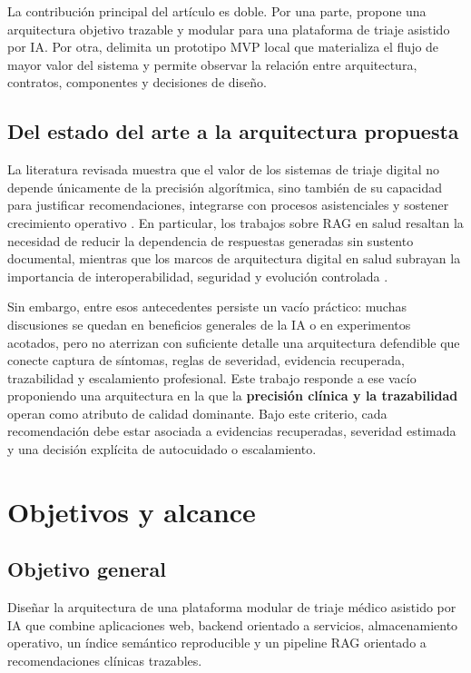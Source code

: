 \documentclass[12pt]{article}
\begin{document}
La contribución principal del artículo es doble. Por una parte, propone una arquitectura objetivo trazable y modular para una plataforma de triaje asistido por IA. Por otra, delimita un prototipo MVP local que materializa el flujo de mayor valor del sistema y permite observar la relación entre arquitectura, contratos, componentes y decisiones de diseño.

\subsection{Del estado del arte a la arquitectura propuesta}

La literatura revisada muestra que el valor de los sistemas de triaje digital no depende únicamente de la precisión algorítmica, sino también de su capacidad para justificar recomendaciones, integrarse con procesos asistenciales y sostener crecimiento operativo \cite{martinez2017, shen2023, rodriguez2026}. En particular, los trabajos sobre RAG en salud resaltan la necesidad de reducir la dependencia de respuestas generadas sin sustento documental, mientras que los marcos de arquitectura digital en salud subrayan la importancia de interoperabilidad, seguridad y evolución controlada \cite{neha2024, who2025dhea, minciencias2021}.

Sin embargo, entre esos antecedentes persiste un vacío práctico: muchas discusiones se quedan en beneficios generales de la IA o en experimentos acotados, pero no aterrizan con suficiente detalle una arquitectura defendible que conecte captura de síntomas, reglas de severidad, evidencia recuperada, trazabilidad y escalamiento profesional. Este trabajo responde a ese vacío proponiendo una arquitectura en la que la \textbf{precisión clínica y la trazabilidad} operan como atributo de calidad dominante. Bajo este criterio, cada recomendación debe estar asociada a evidencias recuperadas, severidad estimada y una decisión explícita de autocuidado o escalamiento.

\section{Objetivos y alcance}

\subsection{Objetivo general}

Diseñar la arquitectura de una plataforma modular de triaje médico asistido por IA que combine aplicaciones web, backend orientado a servicios, almacenamiento operativo, un índice semántico reproducible y un pipeline RAG orientado a recomendaciones clínicas trazables.
\end{document}
